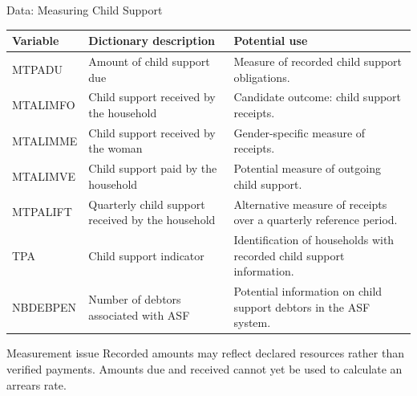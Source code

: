 \documentclass[aspectratio=169,10pt]{beamer}
\begin{document}
\begin{frame}{Data: Measuring Child Support}

\scriptsize
\renewcommand{\arraystretch}{1.12}
\setlength{\tabcolsep}{4pt}

\begin{tabularx}{\textwidth}{
>{\ttfamily}p{1.8cm} p{4.0cm} X
}
\toprule
\textrm{\textbf{Variable}} &
\textbf{Dictionary description} &
\textbf{Potential use} \\
\midrule

MTPADU &
Amount of child support due &
Measure of recorded child support obligations. \\

MTALIMFO &
Child support received by the household &
Candidate outcome: child support receipts. \\

MTALIMME &
Child support received by the woman &
Gender-specific measure of receipts. \\

MTALIMVE &
Child support paid by the household &
Potential measure of outgoing child support. \\

MTPALIFT &
Quarterly child support received by the household &
Alternative measure of receipts over a quarterly
reference period. \\

TPA &
Child support indicator &
Identification of households with recorded
child support information. \\

NBDEBPEN &
Number of debtors associated with ASF &
Potential information on child support debtors
in the ASF system. \\

\bottomrule
\end{tabularx}

\vspace{0.12cm}

\begin{block}{Measurement issue}
\scriptsize
Recorded amounts may reflect declared resources rather
than verified payments. Amounts due and received cannot
yet be used to calculate an arrears rate.
\end{block}

\end{frame}
\end{document}
